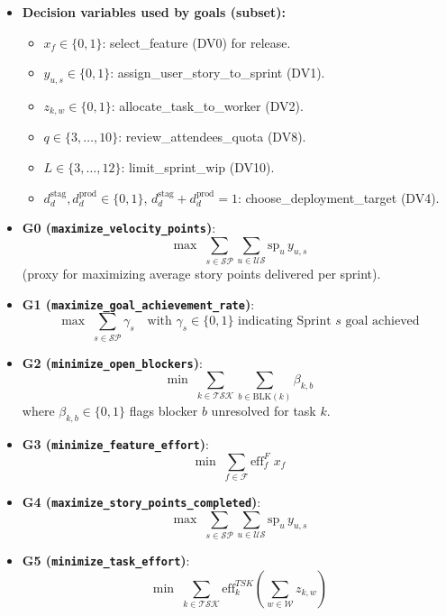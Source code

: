 \documentclass[11pt,a4paper]{article}
\begin{document}
\begin{itemize}[leftmargin=1.2em]
  \item \textbf{Decision variables used by goals (subset):}
  \begin{itemize}
    \item $x_f \in \{0,1\}$: select\_feature (DV0) for release.
    \item $y_{u,s} \in \{0,1\}$: assign\_user\_story\_to\_sprint (DV1).
    \item $z_{k,w} \in \{0,1\}$: allocate\_task\_to\_worker (DV2).
    \item $q \in \{3,\dots,10\}$: review\_attendees\_quota (DV8).
    \item $L \in \{3,\dots,12\}$: limit\_sprint\_wip (DV10).
    \item $d^{\text{stag}}_{d}, d^{\text{prod}}_{d} \in \{0,1\}$, $d^{\text{stag}}_{d}+d^{\text{prod}}_{d}=1$: choose\_deployment\_target (DV4).
  \end{itemize}

  \item \textbf{G0 (\texttt{maximize\_velocity\_points})}: 
  \[
    \max \; \sum_{s \in \mathcal{SP}} \sum_{u \in \mathcal{US}} \mathrm{sp}_u \, y_{u,s}
  \]
  (proxy for maximizing average story points delivered per sprint).

  \item \textbf{G1 (\texttt{maximize\_goal\_achievement\_rate})}:
  \[
    \max \; \sum_{s \in \mathcal{SP}} \gamma_s \quad \text{with } \gamma_s \in \{0,1\} \text{ indicating Sprint $s$ goal achieved}
  \]

  \item \textbf{G2 (\texttt{minimize\_open\_blockers})}:
  \[
    \min \; \sum_{k \in \mathcal{TSK}} \sum_{b \in \mathrm{BLK}(k)} \beta_{k,b}
  \]
  where $\beta_{k,b}\in\{0,1\}$ flags blocker $b$ unresolved for task $k$.

  \item \textbf{G3 (\texttt{minimize\_feature\_effort})}:
  \[
    \min \; \sum_{f \in \mathcal{F}} \mathrm{eff}^{F}_f \; x_f
  \]

  \item \textbf{G4 (\texttt{maximize\_story\_points\_completed})}:
  \[
    \max \; \sum_{s \in \mathcal{SP}} \sum_{u \in \mathcal{US}} \mathrm{sp}_u \, y_{u,s}
  \]

  \item \textbf{G5 (\texttt{minimize\_task\_effort})}:
  \[
    \min \; \sum_{k \in \mathcal{TSK}} \mathrm{eff}^{TSK}_k \left(\sum_{w \in \mathcal{W}} z_{k,w}\right)
  \]


\end{itemize}
\end{document}
